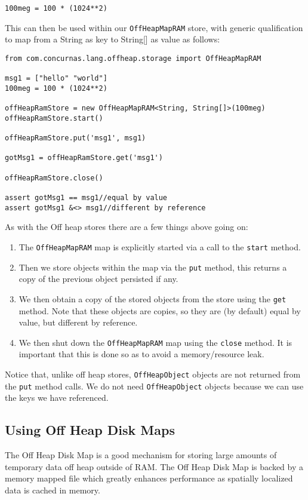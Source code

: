 \documentclass[conc-doc]{subfiles}
\begin{document}
\begin{lstlisting}
100meg = 100 * (1024**2)
\end{lstlisting}

This can then be used within our \lstinline{OffHeapMapRAM} store, with generic qualification to map from a String as key to String[] as value as follows:

\begin{lstlisting}
from com.concurnas.lang.offheap.storage import OffHeapMapRAM

msg1 = ["hello" "world"]
100meg = 100 * (1024**2)

offHeapRamStore = new OffHeapMapRAM<String, String[]>(100meg)
offHeapRamStore.start()

offHeapRamStore.put('msg1', msg1)

gotMsg1 = offHeapRamStore.get('msg1')

offHeapRamStore.close()

assert gotMsg1 == msg1//equal by value
assert gotMsg1 &<> msg1//different by reference
\end{lstlisting}

As with the Off heap stores there are a few things above going on:

\begin{enumerate}
	\item The \lstinline{OffHeapMapRAM} map is explicitly started via a call to the \lstinline{start} method.
	\item Then we store objects within the map via the \lstinline{put} method, this returns a copy of the previous object persisted if any.
	\item We then obtain a copy of the stored objects from the store using the \lstinline{get} method. Note that these objects are copies, so they are (by default) equal by value, but different by reference.
	\item We then shut down the \lstinline{OffHeapMapRAM} map using the \lstinline{close} method. It is important that this is done so as to avoid a memory/resource leak.
\end{enumerate}

Notice that, unlike off heap stores, \lstinline{OffHeapObject} objects are not returned from the \lstinline{put} method calls. We do not need \lstinline{OffHeapObject} objects because we can use the keys we have referenced.

\subsection{Using Off Heap Disk Maps}
The Off Heap Disk Map is a good mechanism for storing large amounts of temporary data off heap outside of RAM. The Off Heap Disk Map is backed by a memory mapped file which greatly enhances performance as spatially localized data is cached in memory.
\end{document}
